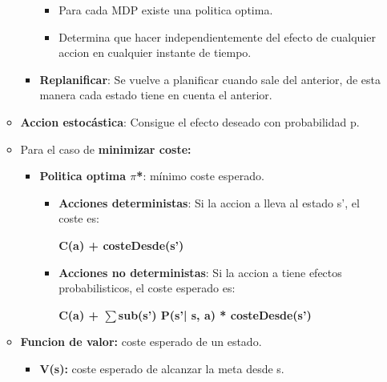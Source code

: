 \documentclass[12pt, twoside, openright]{report} %
\begin{document}
\begin{itemize}
\begin{itemize}
\begin{itemize}
\begin{itemize}
        \item Para cada MDP existe una politica optima.
          
        \item Determina que hacer independientemente del efecto de cualquier
          accion en cualquier instante de tiempo.
          
        \end{itemize}
      \item \textbf{Replanificar}: Se vuelve a planificar cuando sale del
        anterior, de esta manera cada estado tiene en cuenta el
        anterior.
        
      \end{itemize}
    \item \textbf{Accion estocástica}: Consigue el efecto deseado con
      probabilidad p.
      
    \item Para el caso de \textbf{minimizar coste:}
      

      \begin{itemize}
      \item \textbf{Politica optima $\pi$*}: mínimo coste esperado.
        

        \begin{itemize}
        \item \textbf{Acciones deterministas}: Si la accion a lleva al
          estado s', el coste es:
          

         
		  
            \textbf{C(a) + costeDesde(s')}
          
			
        \item \textbf{Acciones no deterministas}: Si la accion a tiene
          efectos probabilisticos, el coste esperado es:
          

          
		  
            \textbf{C(a) + $\sum\limits$sub(s') P(s'|{} s, a) *
            costeDesde(s')}
          
			
        \end{itemize}
      \end{itemize}
    \item \textbf{Funcion de valor:} coste esperado de un estado.
      

      \begin{itemize}
      \item \textbf{V(s):} coste esperado de alcanzar la meta desde s.
        

\end{itemize}
\end{itemize}
\end{itemize}
\end{document}
